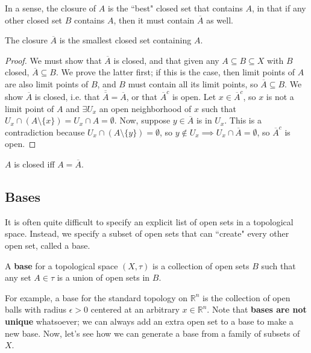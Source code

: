 	In a sense, the closure of $A$ is the ``best" closed set that contains $A$, in that if any other closed set $B$ contains $A$, then it must contain $\overline A$ as well.
	
	\begin{theorem}
		The closure $\overline A$ is the smallest closed set containing $A$.
	\end{theorem}
	
	\begin{proof}
		We must show that $\overline A$ is closed, and that given any $A\subseteq B\subseteq X$ with $B$ closed, $\overline A\subseteq B$. We prove the latter first; if this is the case, then limit points of $A$ are also limit points of $B$, and $B$ must contain all its limit points, so $\overline A\subseteq B$. We show $\overline A$ is closed, i.e. that $\overline{\overline A} = \overline A$, or that $\overline A^c$ is open. Let $x\in \overline A^c$, so $x$ is not a limit point of $A$ and $\exists U_x$ an open neighborhood of $x$ such that $U_x\cap (A\setminus \{x\}) = U_x\cap A = \emptyset$. Now, suppose $y\in\overline A$ is in $U_x$. This is a contradiction because $U_x\cap(A\setminus\{y\}) = \emptyset$, so $y\notin U_x\implies U_x\cap \overline A = \emptyset$, so $\overline A^c$ is open. 
	\end{proof}
	
	\begin{corollary}
		$A$ is closed iff $A = \overline A$. 
	\end{corollary}
	
	\subsection{Bases}
	
	It is often quite difficult to specify an explicit list of open sets in a topological space. Instead, we specify a subset of open sets that can ``create" every other open 
	set, called a base.
	
	\begin{definition}[Base]
		A \textbf{base} for a topological space $(X, \tau)$ is a collection of open sets $B$ such that any set $A\in\tau$ is a union of open sets in $B$.
	\end{definition}
	
	For example, a base for the standard topology on $\mathbb R^n$ is the collection of open balls with radius $\epsilon > 0$ centered at an arbitrary $x\in\mathbb R^n$. Note that \textbf{bases are not unique} whatsoever; we can always add an extra open set to a base to make a new base. Now, let's see how we can generate a base from a family of subsets of $X$. 
	
